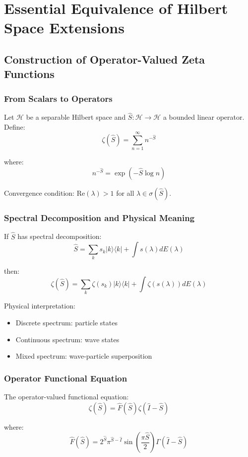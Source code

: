 \documentclass[11pt]{article}
\theoremstyle{plain}
\theoremstyle{definition}
\theoremstyle{remark}
\begin{document}
\section{Essential Equivalence of Hilbert Space Extensions}

\subsection{Construction of Operator-Valued Zeta Functions}

\subsubsection{From Scalars to Operators}

Let $\mathcal{H}$ be a separable Hilbert space and $\hat{S}: \mathcal{H} \to \mathcal{H}$ a bounded linear operator. Define:
$$\zeta(\hat{S}) = \sum_{n=1}^{\infty} n^{-\hat{S}}$$

where:
$$n^{-\hat{S}} = \exp(-\hat{S} \log n)$$

Convergence condition: $\text{Re}(\lambda) > 1$ for all $\lambda \in \sigma(\hat{S})$.

\subsubsection{Spectral Decomposition and Physical Meaning}

If $\hat{S}$ has spectral decomposition:
$$\hat{S} = \sum_{k} s_k |k\rangle\langle k| + \int s(\lambda) dE(\lambda)$$

then:
$$\zeta(\hat{S}) = \sum_{k} \zeta(s_k) |k\rangle\langle k| + \int \zeta(s(\lambda)) dE(\lambda)$$

Physical interpretation:
\begin{itemize}
\item Discrete spectrum: particle states
\item Continuous spectrum: wave states
\item Mixed spectrum: wave-particle superposition
\end{itemize}

\subsubsection{Operator Functional Equation}

The operator-valued functional equation:
$$\zeta(\hat{S}) = \hat{F}(\hat{S}) \zeta(\hat{I} - \hat{S})$$

where:
$$\hat{F}(\hat{S}) = 2^{\hat{S}} \pi^{\hat{S}-\hat{I}} \sin\left(\frac{\pi \hat{S}}{2}\right) \Gamma(\hat{I} - \hat{S})$$
\end{document}

